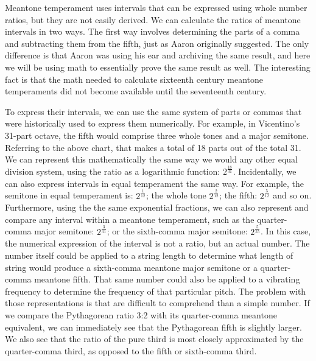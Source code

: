 Meantone temperament uses intervals that can be expressed using whole number ratios, but
they are not easily derived.  We can calculate the ratios of meantone intervals in two ways.
The first way involves determining the parts of a comma and subtracting them from the fifth,
just as Aaron originally suggested.  The only difference is that Aaron was using his
ear and archiving the same result, and here we will be using math to essentially prove
the same result as well.  The interesting fact is that the math needed to calculate
sixteenth century meantone temperaments did not become available until the seventeenth
century.

To express their intervals, we can use the same system of parts or commas
that were historically used to express them numerically.  For example, in Vicentino's
31-part octave, the fifth would comprise three whole tones and a major semitone.
Referring to the above chart, that makes a total of 18 parts out of the total
31.  We can represent this mathematically the same way we would any other equal division
system, using the ratio as a logarithmic function: $2^\frac{18}{31}$.  Incidentally, we can
also express intervals in equal temperament the same way.  For example, the semitone in
equal temperament is: $ 2^\frac{1}{12} $; the whole tone $ 2^\frac{2}{12} $; the fifth:
$ 2^\frac{5}{12} $ and so on.  Furthermore, using the the same exponential fractions,
we can also represent and compare any interval within a meantone temperament, such as
the quarter-comma major semitone: $ 2^\frac{3}{31} $; or the sixth-comma major semitone:
$ 2^\frac{5}{55} $.  In this case, the numerical expression of the interval is not a
ratio, but an actual number.  The number itself could be applied to a string length
to determine what length of string would produce a sixth-comma meantone major semitone
or a quarter-comma meantone fifth.  That same number could also be applied to a vibrating
frequency to determine the frequency of that particular pitch.  The problem with those
representations is that are difficult to comprehend than a simple number.  If we compare the
Pythagorean ratio 3:2 with its quarter-comma meantone equivalent, we can immediately see that
the Pythagorean fifth is slightly larger.  We also see that the ratio of the pure third is
most closely approximated by the quarter-comma third, as opposed to the fifth or sixth-comma
third.

